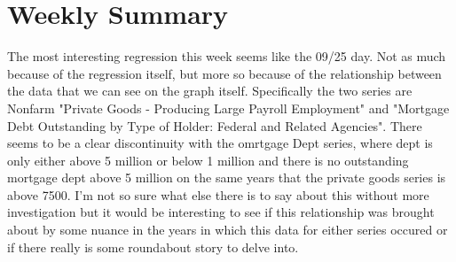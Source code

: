 \section{Weekly Summary}

The most interesting regression this week seems like the 09/25 day. Not as much because of the regression itself, but more so because of the relationship between the data that we can see on the graph itself. Specifically the two series are Nonfarm "Private Goods - Producing Large Payroll Employment" and "Mortgage Debt Outstanding by Type of 
Holder: Federal and Related Agencies". There seems to be a clear discontinuity with the omrtgage Dept series, where dept is only either above 5 million or below 1 million and there is no outstanding mortgage dept above 5 million on the same years that the private goods series is above 7500. I'm not so sure what else there is to say about this without more investigation but it would be interesting to see if this relationship was brought about by some nuance in the years in which this data for either series occured or if there really is some roundabout story to delve into.